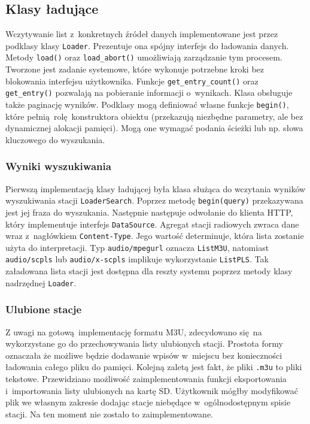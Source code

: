 \documentclass[polish]{aghengthesis}
\begin{document}
			
		\subsection{Klasy ładujące}
			Wczytywanie list z~konkretnych źródeł danych implementowane jest przez podklasy klasy \lstinline|Loader|. Prezentuje ona spójny interfejs do ładowania danych. Metody \lstinline|load()| oraz \lstinline|load_abort()| umożliwiają zarządzanie tym procesem. Tworzone jest zadanie systemowe, które wykonuje potrzebne kroki bez blokowania interfejsu użytkownika. Funkcje \lstinline|get_entry_count()| oraz \lstinline|get_entry()| pozwalają na pobieranie informacji o~wynikach. Klasa obsługuje także paginację wyników. Podklasy mogą definiować własne funkcje \lstinline|begin()|, które pełnią rolę konstruktora obiektu (przekazują niezbędne parametry, ale bez dynamicznej alokacji pamięci). Mogą one wymagać podania ścieżki lub np. słowa kluczowego do wyszukania.
			
			\subsubsection{Wyniki wyszukiwania}
				Pierwszą implementacją klasy ładującej była klasa służąca do wczytania wyników wyszukiwania stacji \lstinline|LoaderSearch|. Poprzez metodę \lstinline|begin(query)| przekazywana jest jej fraza do wyszukania. Następnie następuje odwołanie do klienta HTTP, który implementuje interfejs \lstinline|DataSource|. Agregat stacji radiowych zwraca dane wraz z~nagłówkiem \lstinline|Content-Type|. Jego wartość determinuje, która lista zostanie użyta do interpretacji. Typ \lstinline|audio/mpegurl| oznacza \lstinline|ListM3U|, natomiast \lstinline|audio/scpls| lub \lstinline|audio/x-scpls| implikuje wykorzystanie \lstinline|ListPLS|. Tak załadowana lista stacji jest dostępna dla reszty systemu poprzez metody klasy nadrzędnej \lstinline|Loader|.
			
			\subsubsection{Ulubione stacje}
				Z uwagi na gotową implementację formatu M3U, zdecydowano się na wykorzystane go do przechowywania listy ulubionych stacji. Prostota formy oznaczała że możliwe będzie dodawanie wpisów w~miejscu bez konieczności ładowania całego pliku do pamięci. Kolejną zaletą jest fakt, że pliki \lstinline|.m3u| to pliki tekstowe. Przewidziano możliwość zaimplementowania funkcji eksportowania i~importowania listy ulubionych na kartę SD. Użytkownik mógłby modyfikować plik we własnym zakresie dodając stacje niebędące w~ogólnodostępnym spisie stacji. Na ten moment nie zostało to zaimplementowane.
\end{document}
